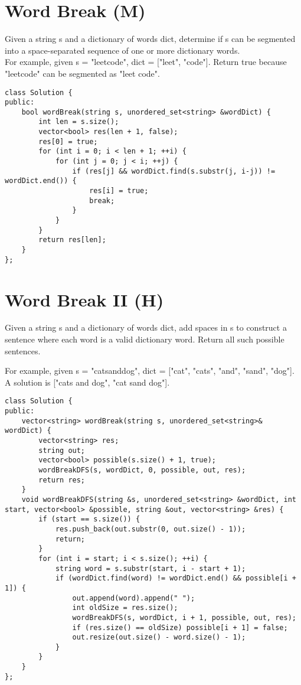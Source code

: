 \section{Word Break (M)}
Given a string s and a dictionary of words dict, determine if s can be segmented into a space-separated sequence of one or more dictionary words.\\

For example, given
s = "leetcode",
dict = ["leet", "code"].
Return true because "leetcode" can be segmented as "leet code". \\

\begin{lstlisting}
class Solution {
public:
    bool wordBreak(string s, unordered_set<string> &wordDict) {
        int len = s.size();
        vector<bool> res(len + 1, false);
        res[0] = true;
        for (int i = 0; i < len + 1; ++i) {
            for (int j = 0; j < i; ++j) {
                if (res[j] && wordDict.find(s.substr(j, i-j)) != wordDict.end()) {
                    res[i] = true;
                    break;
                }
            }
        }
        return res[len];
    }
};
\end{lstlisting}


\section{Word Break II (H)}
Given a string s and a dictionary of words dict, add spaces in s to construct a sentence where each word is a valid dictionary word. Return all such possible sentences.

For example, given
s = "catsanddog",
dict = ["cat", "cats", "and", "sand", "dog"].
A solution is ["cats and dog", "cat sand dog"]. \\

\begin{lstlisting}
class Solution {
public:
    vector<string> wordBreak(string s, unordered_set<string>& wordDict) {
        vector<string> res;
        string out;
        vector<bool> possible(s.size() + 1, true);
        wordBreakDFS(s, wordDict, 0, possible, out, res);
        return res;
    }
    void wordBreakDFS(string &s, unordered_set<string> &wordDict, int start, vector<bool> &possible, string &out, vector<string> &res) {
        if (start == s.size()) {
            res.push_back(out.substr(0, out.size() - 1));
            return;
        }
        for (int i = start; i < s.size(); ++i) {
            string word = s.substr(start, i - start + 1);
            if (wordDict.find(word) != wordDict.end() && possible[i + 1]) {
                out.append(word).append(" ");
                int oldSize = res.size();
                wordBreakDFS(s, wordDict, i + 1, possible, out, res);
                if (res.size() == oldSize) possible[i + 1] = false;
                out.resize(out.size() - word.size() - 1);
            }
        }
    }
};
\end{lstlisting}



